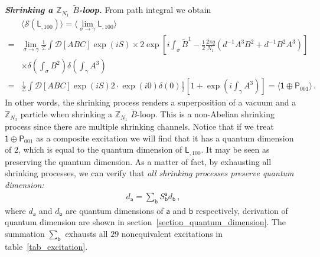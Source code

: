 \documentclass[11pt,nofootinbib,preprint]{revtex4-1}
\begin{document}
\textbf{\textit{Shrinking a $\mathbb{Z}_{N_1}$ $\tilde{B}$-loop.}}
From path integral we obtain 
\begin{align}
	&\langle \mathcal{S} \left( \mathsf{L}_{,100} \right) \rangle =\langle \underset{\sigma \rightarrow \gamma}{\lim}\mathsf{L}_{,100}\rangle \nonumber
	\\
	=&\underset{\sigma \rightarrow \gamma}{\lim}\frac{1}{\mathcal{Z}}\int{\mathcal{D} \left[ ABC \right] \exp \left( iS \right)}\times 2\exp \left[ i\int_{\sigma}{\tilde{B}^1-\frac{1}{2}\frac{2\pi q}{N_1}\left( d^{-1}A^3B^2+d^{-1}B^2A^3 \right)} \right]  \nonumber
	\\
	&\times \delta \left( \int_{\sigma}{B^2} \right) \delta \left( \int_{\gamma}{A^3} \right) \nonumber
	\\
	=&\frac{1}{\mathcal{Z}}\int{\mathcal{D} \left[ ABC \right] \exp \left( iS \right) 2\cdot \exp \left( i0 \right) \delta \left( 0 \right) \frac{1}{2}\left[ 1+\exp \left( i\int_{\gamma}{A^3} \right) \right]}=\langle \mathsf{1}\oplus\mathsf{P}_{001}\rangle \,.\label{eq_SL,100}
\end{align}
In other words, the shrinking process renders a superposition of a vacuum and a $\mathbb{Z}_{N_3}$ particle when shrinking a $\mathbb{Z}_{N_1}$ $\tilde{B}$-loop. This is a non-Abelian shrinking process since there are multiple shrinking channels. Notice that if we treat  $\mathsf{1}\oplus\mathsf{P}_{001}$ as a composite excitation we will find that it has a quantum dimension of $2$, which is equal to the quantum dimension of $\mathsf{L}_{,100}$. It may be seen as preserving the quantum dimension. As a matter of fact, by exhausting all shrinking processes, we can verify that \textit{all shrinking processes preserve quantum dimension:}
\begin{align}
	d_{\mathsf{a}}=\sum_{\mathsf{b}}{S_{\mathsf{b}}^{\mathsf{a}}d_{\mathsf{b}}}\,,
\end{align} 
where $d_{\mathsf{a}}$ and $d_{\mathsf{b}}$ are quantum dimensions of  ${\mathsf{a}}$ and ${\mathsf{b}}$ respectively, derivation of quantum dimension are shown in section~\ref{section_quantum_dimension}. The summation $\sum_{\mathsf{b}}$ exhausts all $29$ nonequivalent excitations in table~\ref{tab_excitation}.
\end{document}

